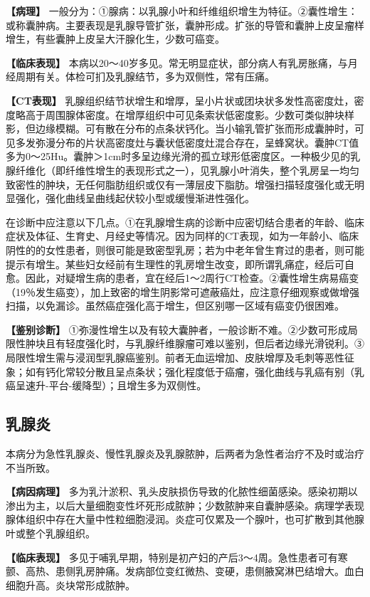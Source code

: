\textbf{【病理】}
一般分为：①腺病：以乳腺小叶和纤维组织增生为特征。②囊性增生：或称囊肿病。主要表现是乳腺导管扩张，囊肿形成。扩张的导管和囊肿上皮呈瘤样增生，有些囊肿上皮呈大汗腺化生，少数可癌变。

\textbf{【临床表现】}
本病以20～40岁多见。常无明显症状，部分病人有乳房胀痛，与月经周期有关。体检可扪及乳腺结节，多为双侧性，常有压痛。

\textbf{【CT表现】}
乳腺组织结节状增生和增厚，呈小片状或团块状多发性高密度灶，密度略高于周围腺体密度。在增厚组织中可见条索状低密度影。少数可类似肿块样影，但边缘模糊。可有散在分布的点条状钙化。当小输乳管扩张而形成囊肿时，可见多发弥漫分布的片状高密度灶与囊状低密度灶混合存在，呈蜂窝状。囊肿CT值多为0～25Hu。囊肿＞1cm时多呈边缘光滑的孤立球形低密度区。一种极少见的乳腺纤维化（即纤维性增生的表现形式之一），见乳腺小叶消失，整个乳房呈一均匀致密性的肿块，无任何脂肪组织或仅有一薄层皮下脂肪。增强扫描轻度强化或无明显强化，强化曲线呈曲线起伏较小型或缓慢渐进性强化。

在诊断中应注意以下几点。①在乳腺增生病的诊断中应密切结合患者的年龄、临床症状及体征、生育史、月经史等情况。因为同样的CT表现，如为一年龄小、临床阴性的的女性患者，则很可能是致密型乳房；若为中老年曾生育过的患者，则可能提示有增生。某些妇女经前有生理性的乳房增生改变，即所谓乳痛症，经后可自愈。因此，对疑增生病的患者，宜在经后1～2周行CT检查。②囊性增生病易癌变（19％发生癌变），加上致密的增生阴影常可遮蔽癌灶，应注意仔细观察或做增强扫描，以免漏诊。虽然癌症强化高于增生，但区别哪一区域有癌变仍很困难。

\textbf{【鉴别诊断】}
①弥漫性增生以及有较大囊肿者，一般诊断不难。②少数可形成局限性肿块且有轻度强化时，与乳腺纤维腺瘤可难以鉴别，但后者边缘光滑锐利。③局限性增生需与浸润型乳腺癌鉴别。前者无血运增加、皮肤增厚及毛刺等恶性征象；如有钙化常较分散且呈点条状；强化程度低于癌瘤，强化曲线与乳癌有别（乳癌呈速升-平台-缓降型）；且增生多为双侧性。

\subsection{乳腺炎}

本病分为急性乳腺炎、慢性乳腺炎及乳腺脓肿，后两者为急性者治疗不及时或治疗不当所致。

\textbf{【病因病理】}
多为乳汁淤积、乳头皮肤损伤导致的化脓性细菌感染。感染初期以渗出为主，以后大量细胞变性坏死形成脓肿；少数脓肿来自囊肿感染。病理学表现腺体组织中存在大量中性粒细胞浸润。炎症可仅累及一个腺叶，也可扩散到其他腺叶或整个乳腺组织。

\textbf{【临床表现】}
多见于哺乳早期，特别是初产妇的产后3～4周。急性患者可有寒颤、高热、患侧乳房肿痛。发病部位变红微热、变硬，患侧腋窝淋巴结增大。血白细胞升高。炎块常形成脓肿。


